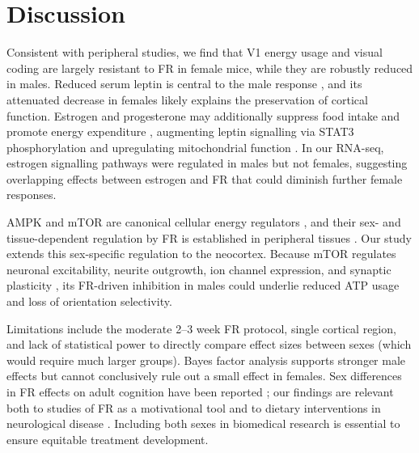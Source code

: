 \documentclass[11pt]{article}
\begin{document}
\section{Discussion}
Consistent with peripheral studies, we find that V1 energy usage and visual coding are largely resistant to FR in female mice, while they are robustly reduced in males. Reduced serum leptin is central to the male response \cite{padamsey2022neocortex}, and its attenuated decrease in females likely explains the preservation of cortical function. Estrogen and progesterone may additionally suppress food intake and promote energy expenditure \cite{brown2015estrogen}, augmenting leptin signalling via STAT3 phosphorylation \cite{gao2007estrogens} and upregulating mitochondrial function \cite{klinge2008mitochondrial,ventura2018sex}. In our RNA-seq, estrogen signalling pathways were regulated in males but not females, suggesting overlapping effects between estrogen and FR that could diminish further female responses.

AMPK and mTOR are canonical cellular energy regulators \cite{mihaylova2011ampk,saxton2017mtor}, and their sex- and tissue-dependent regulation by FR is established in peripheral tissues \cite{ventura2018sex,goldspink2019exercise,kenny2013endurance}. Our study extends this sex-specific regulation to the neocortex. Because mTOR regulates neuronal excitability, neurite outgrowth, ion channel expression, and synaptic plasticity \cite{saxton2017mtor}, its FR-driven inhibition in males could underlie reduced ATP usage and loss of orientation selectivity.

Limitations include the moderate 2--3 week FR protocol, single cortical region, and lack of statistical power to directly compare effect sizes between sexes (which would require much larger groups). Bayes factor analysis supports stronger male effects but cannot conclusively rule out a small effect in females. Sex differences in FR effects on adult cognition have been reported \cite{hallet2017juvenile,hallet2019juvenile}; our findings are relevant both to studies of FR as a motivational tool and to dietary interventions in neurological disease \cite{mattson2017calorie,gano2014ketogenic}. Including both sexes in biomedical research is essential to ensure equitable treatment development.



\end{document}

